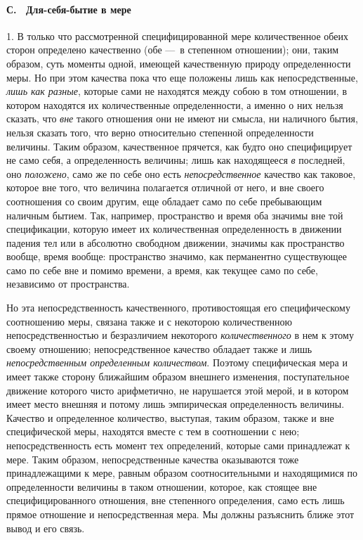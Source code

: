 \paragraph[С. \ Для{}-себя{}-бытие в мере]{С. \ Для-себя-бытие в мере}
\hypertarget{Toc478978679}{}1. В только что рассмотренной специфицированной
мере количественное обеих сторон определено качественно (обе —~в степенном
отношении); они, таким образом, суть моменты одной, имеющей качественную
природу определенности меры. Но при этом качества пока что еще положены
лишь как непосредственные, {\em лишь как разные},
которые сами не находятся между собою в том отношении, в котором находятся
их количественные определенности, а именно о них нельзя сказать, что
{\em вне} такого отношения они не имеют ни смысла, ни
наличного бытия, нельзя сказать того, что верно относительно степенной
определенности величины. Таким образом, качественное прячется, как будто
оно специфицирует не само себя, а определенность величины; лишь как
находящееся {\em в} последней, оно
{\em положено}, само же по себе оно есть
{\em непосредственное} качество как таковое, которое
вне того, что величина полагается отличной от него, и вне своего
соотношения со своим другим, еще обладает само по себе пребывающим наличным
бытием. Так, например, пространство и время оба значимы вне той
спецификации, которую имеет их количественная определенность в движении
падения тел или в абсолютно свободном движении, значимы как пространство
вообще, время вообще: пространство значимо, как перманентно существующее
само по себе вне и помимо времени, а время, как текущее само по себе,
независимо от пространства.

Но эта непосредственность качественного, противостоящая его специфическому
соотношению меры, связана также и с некоторою количественною
непосредственностью и безразличием некоторого
{\em количественного} в нем к этому своему отношению;
непосредственное качество обладает также и лишь
{\em непосредственным определенным количеством}.
Поэтому специфическая мера и имеет также сторону ближайшим образом внешнего
изменения, поступательное движение которого чисто арифметично, не
нарушается этой мерой, и в котором имеет место внешняя и потому лишь
эмпирическая определенность величины. Качество и определенное количество,
выступая, таким образом, также и вне специфической меры, находятся вместе с
тем в соотношении с нею; непосредственность есть момент тех определений,
которые сами принадлежат к мере. Таким образом, непосредственные качества
оказываются тоже принадлежащими к мере, равным образом соотносительными и
находящимися по определенности величины в таком отношении, которое, как
стоящее вне специфицированного отношения, вне степенного определения, само
есть лишь прямое отношение и непосредственная мера. Мы должны разъяснить
ближе этот вывод и его связь.

